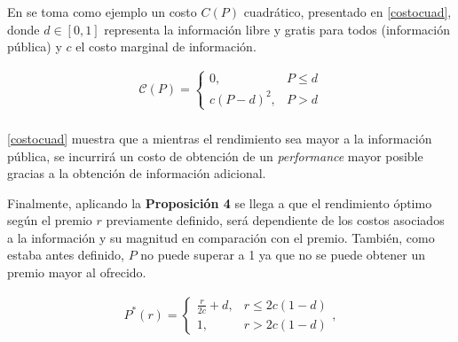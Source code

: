 En  se toma como ejemplo un costo $C(P)$ cuadrático, presentado en \ref{costocuad}, donde $d \in [0,1]$ representa la información libre y gratis para todos (información pública) y $c$ el costo marginal de información. 

\begin{equation}
\begin{array}{rrclcl}
    {\mathcal{C}}(P)=\begin{cases}0,&P\leq d\\c(P-d)^2,&P>d\end{cases}\label{costocuad}\\
\end{array}
\end{equation}
\vspace{2.5mm}

\ref{costocuad} muestra que a mientras el rendimiento sea mayor a la información pública, se incurrirá un costo de obtención de un \textit{performance} mayor posible gracias a la obtención de información adicional.
\vspace{2.5mm}

Finalmente, aplicando la \textbf{Proposición 4} se llega a que el rendimiento óptimo según el premio $r$ previamente definido, será dependiente de los costos asociados a la información y su magnitud en comparación con el premio. También, como estaba antes definido, $P$ no puede superar a 1 ya que no se puede obtener un premio mayor al ofrecido.

\begin{equation}
\begin{array}{rrclcl}
    P^*(r) = \begin{cases}\frac{r}{2c}+d,&r\leq 2c(1-d)\\1,&r>2c(1-d)\end{cases}, \label{perforopt}\\
\end{array}
\end{equation}





